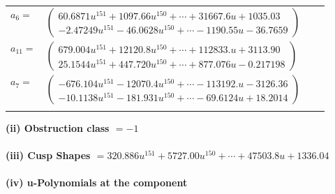\documentclass[1p]{elsarticle_modified}
\theoremstyle{definition}
\begin{document}
\begin{tabular}{m{7pt} m{180pt} m{7pt} m{180pt} }
\flushright $a_{6}=$&$\begin{pmatrix}60.6871 u^{151}+1097.66 u^{150}+\cdots+31667.6 u+1035.03\\-2.47249 u^{151}-46.0628 u^{150}+\cdots-1190.55 u-36.7659\end{pmatrix}$ \\
\flushright $a_{11}=$&$\begin{pmatrix}679.004 u^{151}+12120.8 u^{150}+\cdots+112833. u+3113.90\\25.1544 u^{151}+447.720 u^{150}+\cdots+877.076 u-0.217198\end{pmatrix}$ \\
\flushright $a_{7}=$&$\begin{pmatrix}-676.104 u^{151}-12070.4 u^{150}+\cdots-113192. u-3126.36\\-10.1138 u^{151}-181.931 u^{150}+\cdots-69.6124 u+18.2014\end{pmatrix}$\\&\end{tabular}
\flushleft \textbf{(ii) Obstruction class $= -1$}\\~\\
\flushleft \textbf{(iii) Cusp Shapes $= 320.886 u^{151}+5727.00 u^{150}+\cdots+47503.8 u+1336.04$}\\~\\
\newpage\renewcommand{\arraystretch}{1}
\flushleft \textbf{(iv) u-Polynomials at the component}\newline \\
\end{document}
